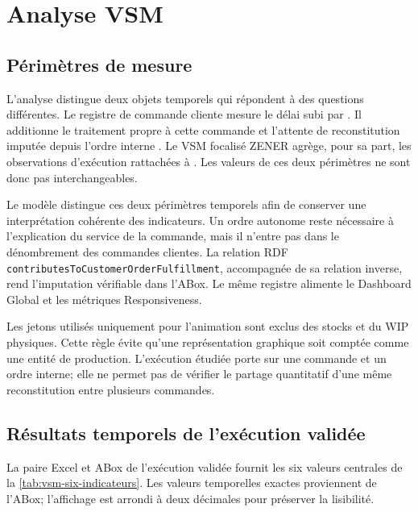 \chapter{Analyse VSM}
\label{chap:analyse-vsm}

\section{Périmètres de mesure}

L'analyse distingue deux objets temporels qui répondent à des questions différentes. Le registre de commande cliente mesure le délai subi par . Il additionne le traitement propre à cette commande et l'attente de reconstitution imputée depuis l'ordre interne . Le VSM focalisé ZENER agrège, pour sa part, les observations d'exécution rattachées à . Les valeurs de ces deux périmètres ne sont donc pas interchangeables.

Le modèle distingue ces deux périmètres temporels afin de conserver une interprétation cohérente des indicateurs. Un ordre autonome reste nécessaire à l'explication du service de la commande, mais il n'entre pas dans le dénombrement des commandes clientes. La relation RDF \texttt{contributesToCustomer}\allowbreak\texttt{OrderFulfillment}, accompagnée de sa relation inverse, rend l'imputation vérifiable dans l'ABox. Le même registre alimente le Dashboard Global et les métriques Responsiveness.

Les jetons utilisés uniquement pour l'animation sont exclus des stocks et du WIP physiques. Cette règle évite qu'une représentation graphique soit comptée comme une entité de production. L'exécution étudiée porte sur une commande et un ordre interne; elle ne permet pas de vérifier le partage quantitatif d'une même reconstitution entre plusieurs commandes.

\section{Résultats temporels de l'exécution validée}

La paire Excel et ABox de l'exécution validée fournit les six valeurs centrales de la \cref{tab:vsm-six-indicateurs}. Les valeurs temporelles exactes proviennent de l'ABox; l'affichage est arrondi à deux décimales pour préserver la lisibilité.

